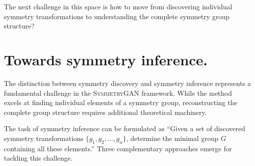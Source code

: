             The next challenge in this space is how to move from discovering individual symmetry transformations to understanding the complete symmetry group structure?

\section{Towards symmetry inference.}
            The distinction between symmetry discovery and symmetry inference represents a fundamental challenge in the \textsc{SymmetryGAN} framework.
            While the method excels at finding individual elements of a symmetry group, reconstructing the complete group structure requires additional theoretical machinery.
            
            The task of symmetry inference can be formulated as ``Given a set of discovered symmetry transformations \(\{g_1, g_2, ..., g_n\}\), determine the minimal group \(G\) containing all these elements.''
            Three complementary approaches emerge for tackling this challenge.
